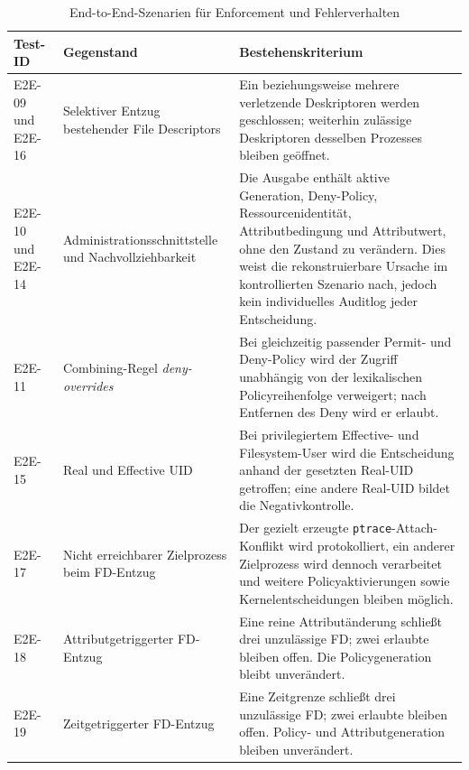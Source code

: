 \begin{table}[htbp]
    \centering
    \begin{tabular}{>{\raggedright\arraybackslash}p{}>{\raggedright\arraybackslash}p{}p{}}
        \hline
        \textbf{Test-ID} & \textbf{Gegenstand} & \textbf{Bestehenskriterium} \\
        \hline
        E2E-09 und E2E-16 & Selektiver Entzug bestehender File Descriptors & Ein beziehungsweise
        mehrere verletzende Deskriptoren werden geschlossen; weiterhin zulässige Deskriptoren
        desselben Prozesses bleiben geöffnet. \\
        E2E-10 und E2E-14 & Administrationsschnittstelle und Nachvollziehbarkeit & Die Ausgabe
        enthält aktive Generation, Deny-Policy, Ressourcenidentität, Attributbedingung und
        Attributwert, ohne den Zustand zu verändern. Dies weist die rekonstruierbare Ursache im
        kontrollierten Szenario nach, jedoch kein individuelles Auditlog jeder Entscheidung. \\
        E2E-11 & Combining-Regel \emph{deny-overrides} & Bei gleichzeitig passender Permit- und
        Deny-Policy wird der Zugriff unabhängig von der lexikalischen Policyreihenfolge verweigert;
        nach Entfernen des Deny wird er erlaubt. \\
        E2E-15 & Real und Effective UID & Bei privilegiertem Effective- und Filesystem-User wird
        die Entscheidung anhand der gesetzten Real-UID getroffen; eine andere Real-UID bildet die
        Negativkontrolle. \\
        E2E-17 & Nicht erreichbarer Zielprozess beim FD-Entzug & Der gezielt erzeugte
        \texttt{ptrace}-Attach-Konflikt wird protokolliert, ein anderer Zielprozess wird dennoch
        verarbeitet und weitere Policyaktivierungen sowie Kernelentscheidungen bleiben möglich. \\
        E2E-18 & Attributgetriggerter FD-Entzug & Eine reine Attributänderung schließt drei
        unzulässige FD; zwei erlaubte bleiben offen. Die Policygeneration bleibt unverändert. \\
        E2E-19 & Zeitgetriggerter FD-Entzug & Eine Zeitgrenze schließt drei unzulässige FD;
        zwei erlaubte bleiben offen. Policy- und Attributgeneration bleiben unverändert. \\
        \hline
    \end{tabular}
    \caption{End-to-End-Szenarien für Enforcement und Fehlerverhalten}
    \label{tab:e2e-enforcement}
\end{table}

